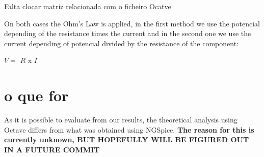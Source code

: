 \vspace{1cm}

Falta clocar matriz relacionada com o ficheiro Ocatve 

\vspace {1cm}

On both cases the Ohm's Law is applied, in the first method we use the potencial depending of the resistance times the current and in the second one we use the current depending of potencial divided by the resistance of the component: 

\vspace{1cm}

$V =$  $R$ x $I$ 
\vspace{1cm} 






\section{o que for}

As it is possible to evaluate from our results, the theoretical analysis using Octave differs from what was obtained using NGSpice. \textbf{The reason for this is currently unknown, BUT HOPEFULLY WILL BE FIGURED OUT IN A FUTURE COMMIT}
